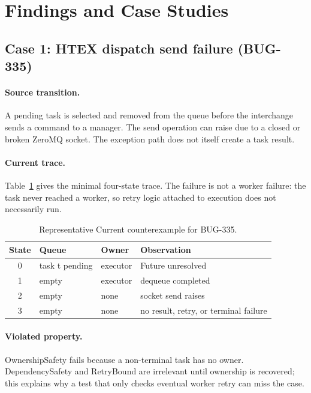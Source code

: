 \documentclass[11pt,a4paper]{article}
\newenvironment{tabularx}[2]{\begin{tabular}{#2}}{\end{tabular}}
\begin{document}
\section{Findings and Case Studies}
\subsection{Case 1: HTEX dispatch send failure (BUG-335)}
\paragraph{Source transition.} A pending task is selected and removed from the queue before the
interchange sends a command to a manager. The send operation can raise due to a closed or broken
ZeroMQ socket. The exception path does not itself create a task result.

\paragraph{Current trace.} Table~\ref{tab:bug335} gives the minimal four-state trace. The failure
is not a worker failure: the task never reached a worker, so retry logic attached to execution does
not necessarily run.

\begin{table}[h]
\centering
\caption{Representative Current counterexample for BUG-335.}
\label{tab:bug335}
\normalsize
\begin{tabularx}{\textwidth}{c p{} p{0.23\textwidth} p{0.30\textwidth}}
\toprule
State & Queue & Owner & Observation \\
\midrule
0 & task t pending & executor & Future unresolved \\
1 & empty & executor & dequeue completed \\
2 & empty & none & socket send raises \\
3 & empty & none & no result, retry, or terminal failure \\
\bottomrule
\end{tabularx}
\end{table}

\paragraph{Violated property.} OwnershipSafety fails because a non-terminal task has no owner.
DependencySafety and RetryBound are irrelevant until ownership is recovered; this explains why a
test that only checks eventual worker retry can miss the case.
\end{document}
